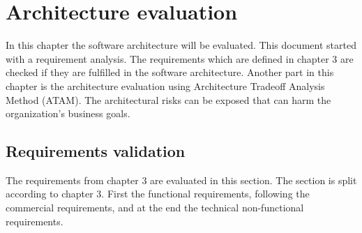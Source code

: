 
\newcommand{\bo}[1]{\textbf{#1}}

\chapter{Architecture evaluation}

\label{ch:evaluation}
In this chapter the software architecture will be evaluated. This document started with a requirement analysis. The requirements which are defined in chapter 3 are checked if they are fulfilled in the software architecture. Another part in this chapter is the architecture evaluation using Architecture Tradeoff Analysis Method (ATAM). The architectural risks can be exposed that can harm the organization's business goals.

\section{Requirements validation}
The requirements from chapter 3 are evaluated in this section. The section is split according to chapter 3. First  the functional requirements, following the commercial requirements, and at the end the technical non-functional requirements.





\clearpage
